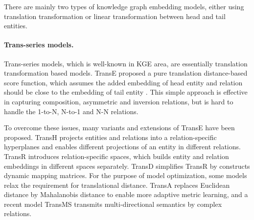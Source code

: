 \documentclass{article}
\begin{document}
\begin{table}[t]
  \caption{The supported relation patterns of several models \cite{rotate}.}
  \label{Relation Prediction Results1-1}
  \centering
\end{table}

There are mainly two types of knowledge graph embedding models, either using translation transformation or linear transformation between head and tail entities.

\paragraph{Trans-series models.} Trans-series models, which is well-known in KGE area, are essentially translation transformation based models. TransE \citep{transe} proposed a pure translation distance-based score function, which assumes the added embedding of head entity  and relation   should be close to the embedding of tail entity . This simple approach is effective in capturing composition, asymmetric and inversion relations, but is hard to handle the 1-to-N, N-to-1 and N-N relations.

To overcome these issues, many variants and extensions of TransE have been proposed. TransH \citep{transh} projects entities and relations into a relation-specific hyperplanes and enables different projections of an entity in different relations. TransR \citep{transr} introduces relation-specific spaces, which builds entity and relation embeddings in different spaces separately.
TransD \citep{transd} simplifies TransR by constructs dynamic mapping matrices.
For the purpose of model optimization, some models relax the requirement for translational distance.
TransA \citep{transa} replaces Euclidean distance by Mahalanobis distance to enable more adaptive metric learning, and a recent model TransMS \citep{transMS} transmits multi-directional semantics by complex relations.
\end{document}

